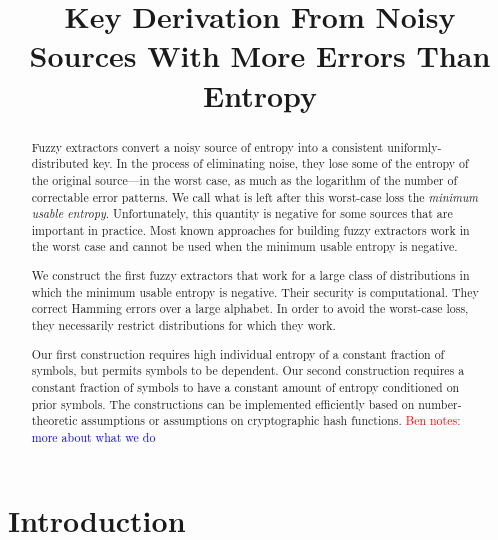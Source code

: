 \documentclass[11pt]{article}
\title{Key Derivation From Noisy Sources With More Errors Than Entropy}
\newcommand{\authnote}[2]{{\textcolor{red}{\textsf{#1 notes: }\textcolor{blue}{ #2}}\marginpar{\textcolor{red}{\textbf{!!!!!}}}}}
\newcommand{\authnote}[2]{}
\newcommand{\bnote}[1]{{\authnote{Ben}{#1}}}
\begin{document}
\maketitle


\begin{abstract}
Fuzzy extractors convert a noisy source of entropy into a consistent uniformly-distributed key.  In the process of eliminating noise, they  lose some of the entropy of the original source---in the worst case, as much as the logarithm of the number of correctable error patterns. We call what is left after this worst-case loss the \emph{minimum usable entropy}.  Unfortunately, this quantity is negative for some sources that are important in practice. Most known approaches for building fuzzy extractors work in the worst case and cannot be used when the minimum usable entropy is negative.

We construct the first fuzzy extractors that work for a large class of distributions in which the minimum usable entropy is negative. Their security is computational.  They correct Hamming errors over a large alphabet. In order to avoid the worst-case loss, they necessarily restrict distributions for which they work.  

Our first construction requires high individual entropy of a constant fraction of symbols, but permits symbols to be dependent.  Our second construction requires  a constant fraction of symbols to have a constant amount of entropy conditioned on prior symbols. The constructions can be implemented efficiently based on number-theoretic assumptions or assumptions on cryptographic hash functions.
\bnote{more about what we do}
\end{abstract}


\section{Introduction}\label{sec:introduction}
\end{document}
